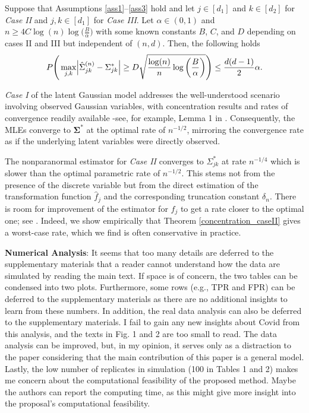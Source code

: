 \begin{change}
    \begin{theorem*}
        Suppose that Assumptions \ref{ass1}--\ref{ass3} hold and let $j \in [d_1]$ and $k \in [d_2]$ for  \textit{Case II} and $j,k \in [d_1]$ for \textit{Case III}. Let $\alpha \in (0,1)$ and \(n \geq 4 C \log(n) \log\Big(\frac{B}{\alpha}\Big)\) with some known constants $B$, $C$, and $D$ depending on cases II and III but independent of $(n,d)$. Then, the following holds
        \begin{equation*}
            P\Bigg(\max_{j,k}\abs{\hat{\Sigma}_{jk}^{(n)} - \Sigma_{jk}^{*}} \geq D\sqrt{\frac{\log(n)}{n} \log\bigg(\frac{B}{\alpha}\bigg)}\Bigg) \leq \frac{d(d-1)}{2}\alpha.
        \end{equation*}
    \end{theorem*}
    \textit{Case I} of the latent Gaussian model addresses the well-understood scenario involving observed Gaussian variables, with concentration results and rates of convergence readily available -see, for example, Lemma 1 in \citet{Ravikumar11}. Consequently, the MLEs converge to \(\mathbf{\Sigma}^{*}\) at the optimal rate of \(n^{-1/2}\), mirroring the convergence rate as if the underlying latent variables were directly observed.
\end{change}

\begin{change}
    The nonparanormal estimator for \textit{Case II} converges to \(\Sigma_{jk}^*\) at rate \(n^{-1/4}\) which is slower than the optimal parametric rate of \(n^{-1/2}\). This stems not from the presence of the discrete variable but from the direct estimation of the transformation function \(\hat{f}_j\) and the corresponding truncation constant \(\delta_n\). There is room for improvement of the estimator for \(f_j\) to get a rate closer to the optimal one; see \citep{Xue12}. Indeed, we show empirically that Theorem \ref{concentration_caseII} gives a worst-case rate, which we find is often conservative in practice.
\end{change}

\begin{point}
    \textbf{Numerical Analysis}: It seems that too many details are deferred to the supplementary materials that a reader cannot understand how the data are simulated by reading the main text. If space is of concern, the two tables can be condensed into two plots. Furthermore, some rows (e.g., TPR and FPR) can be deferred to the supplementary materials as there are no additional insights to learn from these numbers. In addition, the real data analysis can also be deferred to the supplementary materials. I fail to gain any new insights about Covid from this analysis, and the texts in Fig. 1 and 2 are too small to read. The data analysis can be improved, but, in my opinion, it serves only as a distraction to the paper considering that the main contribution of this paper is a general model. Lastly, the low number of replicates in simulation (100 in Tables 1 and 2) makes me concern about the computational feasibility of the proposed method. Maybe the authors can report the computing time, as this might give more insight into the proposal’s computational feasibility.
\end{point}

